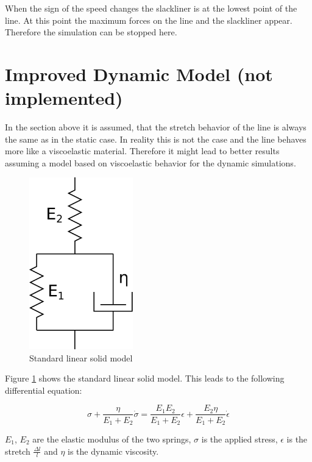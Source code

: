 When the sign of the speed changes the slackliner is at the lowest point of the line. At this point the maximum forces on the line and the slackliner appear. Therefore the simulation can be stopped here.

\section{Improved Dynamic Model (not implemented)}

In the section above it is assumed, that the stretch behavior of the line is always the same as in the static case. In reality this is not the case and the line behaves more like a viscoelastic material. Therefore it might lead to better results assuming a model based on viscoelastic behavior for the dynamic simulations.

\begin{figure}[htb] \centering
	\includegraphics[width=0.4\textwidth]{images/dynamicStandardModel.pdf}
	\caption{Standard linear solid model}
	\label{fig:dynamicStandardModel}
\end{figure}

Figure \ref{fig:dynamicStandardModel} shows the standard linear solid model. This leads to the following differential equation:

\begin{equation}
	\sigma + \frac{\eta}{E_1+E_2}\dot\sigma = \frac{E_1E_2}{E_1+E_2}\epsilon + \frac{E_2\eta}{E_1+E_2}\dot\epsilon
	\label{eqn:standardLinearModel}
\end{equation}

$E_1$, $E_2$ are the elastic modulus of the two springs, $\sigma$ is the applied stress, $\epsilon$ is the stretch $\frac{\Delta l}{l}$ and $\eta$ is the dynamic viscosity. 


